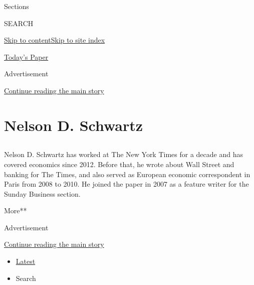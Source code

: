 Sections

SEARCH

\protect\hyperlink{site-content}{Skip to
content}\protect\hyperlink{site-index}{Skip to site index}

\href{https://myaccount.nytimes3xbfgragh.onion/auth/login?response_type=cookie\&client_id=vi}{}

\href{https://www.nytimes3xbfgragh.onion/section/todayspaper}{Today's
Paper}

Advertisement

\protect\hyperlink{after-top}{Continue reading the main story}

\hypertarget{nelson-d-schwartz}{%
\section{Nelson D. Schwartz}\label{nelson-d-schwartz}}

\subsection{}

Nelson D. Schwartz has worked at The New York Times for a decade and has
covered economics since 2012. Before that, he wrote about Wall Street
and banking for The Times, and also served as European economic
correspondent in Paris from 2008 to 2010. He joined the paper in 2007 as
a feature writer for the Sunday Business section.

More**

Advertisement

\protect\hyperlink{after-mid1}{Continue reading the main story}

\begin{itemize}
\tightlist
\item
  \protect\hyperlink{stream-panel}{Latest}
\item
  Search
\end{itemize}


